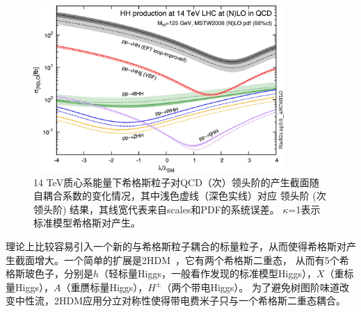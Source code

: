 \begin{figure}[h]
\centering
 \includegraphics[width=0.85\textwidth]{fig/HH_xs_kappa_14TeV.jpg}
  \caption{14 TeV质心系能量下希格斯粒子对QCD（次）领头阶的产生截面随自耦合系数的变化情况，其中浅色虚线（深色实线）对应 领头阶 (次领头阶) 结果，其线宽代表来自scales和PDF的系统误差。 
  $\kappa$=1表示标准模型希格斯对产生。}
  \label{fig:HH_xs_kappa_14TeV}
\end{figure}

理论上比较容易引入一个新的与希格斯粒子耦合的标量粒子，从而使得希格斯对产生截面增大。一个简单的扩展是2HDM~\cite{2HDMTheory}，它有两个希格斯二重态，
从而有5个希格斯玻色子，分别是$h$（轻标量Higgs，一般看作发现的标准模型Higgs），$X$（重标量Higgs），$A$（重赝标量Higgs），$H^{\pm}$（两个带电Higgs）。
为了避免树图阶味道改变中性流，2HDM应用分立对称性使得带电费米子只与一个希格斯二重态耦合。

